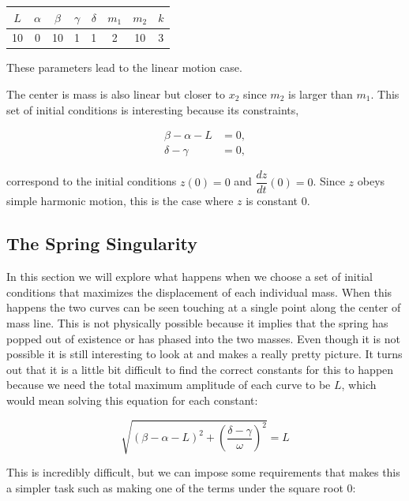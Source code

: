\documentclass[11pt, oneside]{article}   	%
\begin{document}
\begin{center}

\begin{tabular}{| c | c | c | c | c | c | c | c |}

\hline

$L$ & $\alpha$ & $\beta$ & $\gamma$ & $\delta$ & $m_1$ & $m_2$ & $k$ \\

\hline

 10 & 0 & 10 & 1 & 1 & 2 & 10 & 3\\

\hline

\end{tabular}

\end{center}

These parameters lead to the linear motion case.

The center is mass is also linear but closer to $x_2$ since $m_2$ is larger than $m_1$. This set of initial conditions is interesting because its constraints,

\begin{align*}
\beta - \alpha - L &= 0,\\
\delta - \gamma &= 0,
\end{align*}

correspond to the initial conditions $z(0)=0$ and $\dfrac{dz}{dt}(0) = 0$. Since $z$ obeys simple harmonic motion, this is the case where $z$ is constant 0.
\subsection{The Spring Singularity}
In this section we will explore what happens when we choose a set of initial conditions that maximizes the displacement of each individual mass.
When this happens the two curves can be seen touching at a single point along the center of mass line.
This is not physically possible because it implies that the spring has popped out of existence or has phased into the two masses.
Even though it is not possible it is still interesting to look at and makes a really pretty picture.
It turns out that it is a little bit difficult to find the correct constants for this to happen because we need the total maximum amplitude of each curve to be $L$, which would mean solving this equation for each constant:

$$\sqrt{(\beta - \alpha -L)^2 + \left(\frac{\delta - \gamma}{\omega}\right)^2}=L$$

This is incredibly difficult, but we can impose some requirements that makes this a simpler task such as making one of the terms under the square root $0$:
\end{document}
